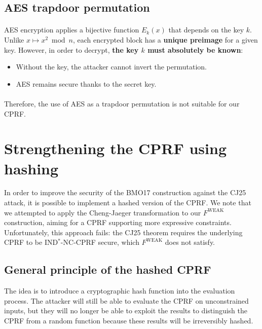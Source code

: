 \documentclass[9pt]{extarticle}
\begin{document}
\subsection{AES trapdoor permutation}
\paragraph{}
AES encryption applies a bijective function \(E_k(x)\) that depends on the key \(k\).
Unlike \(x \mapsto x^2 \bmod n\), each encrypted block has a \textbf{unique preimage} for a given key.
However, in order to decrypt, \textbf{the key \(k\) must absolutely be known}:
\begin{itemize}
    \item Without the key, the attacker cannot invert the permutation.
    \item AES remains secure thanks to the secret key.
\end{itemize}

\paragraph{}
Therefore, the use of AES as a trapdoor permutation is not suitable for our CPRF.




\section{Strengthening the CPRF using hashing}

In order to improve the security of the BMO17 construction against the CJ25 attack, it is possible to implement a hashed version of the CPRF.
We note that we attempted to apply the Cheng-Jaeger transformation to our $F^{\text{WEAK}}$ construction, aiming for a CPRF supporting more expressive constraints.
Unfortunately, this approach fails: the CJ25 theorem requires the underlying CPRF to be IND$^*$-NC-CPRF secure, which $F^{\text{WEAK}}$ does not satisfy.

\subsection{General principle of the hashed CPRF}

The idea is to introduce a cryptographic hash function into the evaluation process. 
The attacker will still be able to evaluate the CPRF on unconstrained inputs, 
but they will no longer be able to exploit the results to distinguish the CPRF from a random function
because these results will be irreversibly hashed.\\
\end{document}
